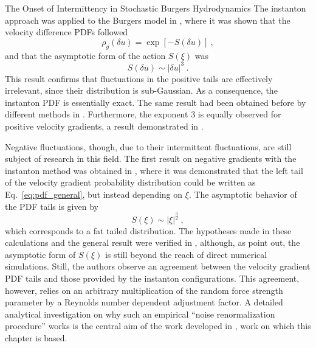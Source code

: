 \begin{chapter}{The Onset of Intermittency in Stochastic Burgers Hydrodynamics}
The instanton approach was applied to the Burgers model in \textcite{gurarie1996}, where it was shown that the velocity difference PDFs followed
\begin{equation} \label{eq:pdf_general}
    \rho_g(\delta u) = \exp [ - S(\delta u) ] \ ,
\end{equation}
and that the asymptotic form of the action $S(\xi)$ was
\begin{equation}
    S(\delta u) \sim |\delta u|^{3} \ .
\end{equation}
This result confirms that fluctuations in the positive tails are effectively irrelevant, since their distribution is sub-Gaussian. As a consequence, the instanton PDF is essentially exact.
The same result had been obtained before by different methods in \textcite{polyakov1995}.
Furthermore, the exponent $3$ is equally observed for positive velocity gradients, a result demonstrated in \textcite{gotoh1998}.

Negative fluctuations, though, due to their intermittent fluctuations, are still subject of research in this field.
The first result on negative gradients with the instanton method was obtained in \textcite{balkovsky1997}, where it was demonstrated that the left tail of the velocity gradient probability distribution could be written as Eq.~\eqref{eq:pdf_general}, but instead depending on $\xi$. The asymptotic behavior of the PDF tails is given by
\begin{equation} \label{eq:left-asymp}
    S(\xi) \sim |\xi|^\frac{3}{2} \ ,
\end{equation}
which corresponds to a fat tailed distribution.
The hypotheses made in these calculations and the general result were verified in \textcite{chernykh2001}, although, as \textcite{grafke2015relevance} point out, the asymptotic form of $S(\xi)$ is still beyond the reach of direct numerical simulations. Still, the authors observe an agreement between the velocity gradient PDF tails and those provided by the instanton configurations. This agreement, however, relies on an arbitrary multiplication of the random force strength parameter by a Reynolds number dependent adjustment factor. A detailed analytical investigation on why such an empirical \enquote{noise renormalization procedure} works is the central aim of the work developed in \textcite{apolinario2019onset}, work on which this chapter is based.


\end{chapter}

